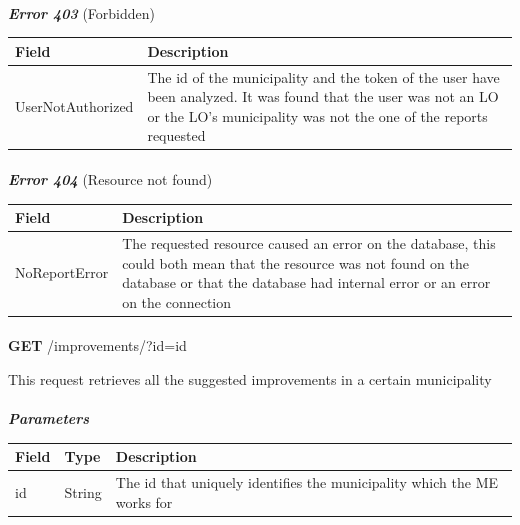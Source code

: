 						\paragraph{}
							\textit{\textbf{Error 403}} (Forbidden)
							\vspace{-2mm}
							\begin{table}[!h]
								\begin{tabular}{L{0.4\textwidth}L{0.4\textwidth}}
									\toprule
									\textbf{Field} & \textbf{Description} \\
									\midrule
								  	UserNotAuthorized & The id of the municipality and the token of the user have been analyzed. It was found that the user was not an LO or the LO's  municipality was not the one of the reports requested  \\
								 	\bottomrule
								\end{tabular}
							\end{table}
						\vspace{-5mm}
						\paragraph{}
							\textit{\textbf{Error 404}} (Resource not found)
							\vspace{-2mm}
							\begin{table}[!h]
								\begin{tabular}{L{0.4\textwidth}L{0.4\textwidth}}
									\toprule
									\textbf{Field} & \textbf{Description} \\
									\midrule
								  	 NoReportError & The requested resource caused an error on the database, this could both mean that the resource was not found on the database or that the database had internal error or an error on the connection \\ 
								 	\bottomrule
								\end{tabular}
							\end{table}
							
						\paragraph{}
						\textbf{GET} /improvements/?id={id}
						
						This request retrieves all the suggested improvements in a certain municipality
						\paragraph{}
							\textit{\textbf{Parameters}}
							\vspace{-2mm}
							\begin{table}[!h]
								\begin{tabular}{L{0.2\textwidth}L{0.2\textwidth}L{0.4\textwidth}}
									\toprule
									\textbf{Field} & \textbf{Type} & \textbf{Description} \\
									\midrule
								 	id & String & The id that uniquely identifies the municipality which the ME works for \\
								 	\bottomrule
								\end{tabular}
							\end{table}
						\clearpage
